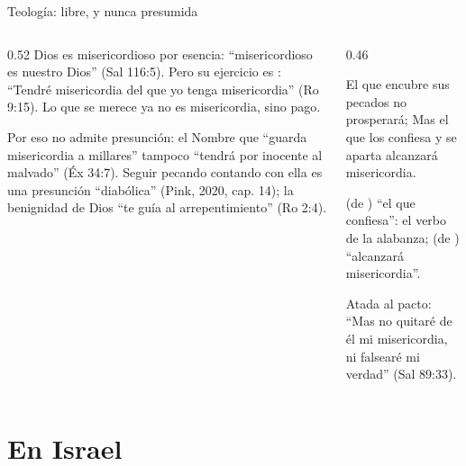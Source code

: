 \begin{frame}{Teología: libre, y nunca presumida}
\begin{columns}[t,onlytextwidth]
\begin{column}{0.52\textwidth}\small
Dios es misericordioso por esencia: ``misericordioso es nuestro Dios'' (Sal 116:5). Pero su ejercicio es : ``Tendré misericordia del que yo tenga misericordia'' (Ro 9:15). Lo que se merece ya no es misericordia, sino pago.\par\medskip
Por eso no admite presunción: el Nombre que ``guarda misericordia a millares'' tampoco ``tendrá por inocente al malvado'' (Éx 34:7). Seguir pecando contando con ella es una presunción ``diabólica'' (Pink, 2020, cap. 14); la benignidad de Dios ``te guía al arrepentimiento'' (Ro 2:4).
\end{column}
\begin{column}{0.46\textwidth}
\begin{cita}El que encubre sus pecados no prosperará; Mas el que los confiesa y se aparta alcanzará misericordia.\end{cita}
\scriptsize{} (de ) ``el que confiesa'': el verbo de la alabanza;  (de ) ``alcanzará misericordia''.\par\smallskip
\small Atada al pacto: ``Mas no quitaré de él mi misericordia, ni falsearé mi verdad'' (Sal 89:33).
\end{column}
\end{columns}
\end{frame}

\section{En Israel}

